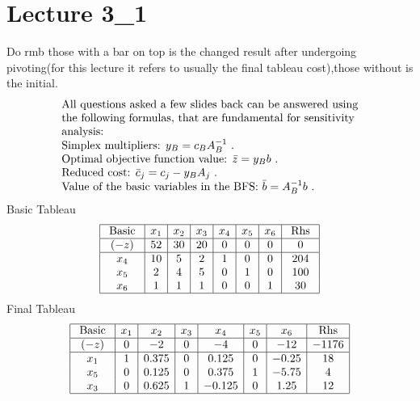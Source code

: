 \documentclass{article}
\begin{document}
\section{Lecture 3\_1}
Do rmb those with a bar on top is the changed result after undergoing pivoting(for this lecture it refers to usually the final tableau cost),those without is the initial.
$$
\begin{array} { l r } { \text { All questions asked a few slides back can be answered using } } \\ { \text { the following formulas, that are fundamental for sensitivity } } \\ { \text { analysis: } } \\ { \text {  Simplex multipliers: } y _ { B } = c _ { B } A _ { B } ^ { - 1 } \text { . } } \\ { \text { Optimal objective function value: } \bar { z } = y _ { B } b \text { . } } \\ { \text { Reduced cost: } \bar { c } _ { j } = c _ { j } - y _ { B } A _ { j } \text { . } } \\ { \text { Value of the basic variables in the BFS: } \bar { b } = A _ { B } ^ { - 1 } b \text { . } } \end{array}
$$
Basic Tableau
$$
\begin{array} { | c | c | c | c | c | c | c | c | } \hline \text { Basic } & { x _ { 1 } } & { x _ { 2 } } & { x _ { 3 } } & { x _ { 4 } } & { x _ { 5 } } & { x _ { 6 } } & { \text { Rhs } } \\ \hline ( - z ) & { 52 } & { 30 } & { 20 } & { 0 } & { 0 } & { 0 } & { 0 } \\ \hline x _ { 4 } & { 10 } & { 5 } & { 2 } & { 1 } & { 0 } & { 0 } & { 204 } \\ { x _ { 5 } } & { 2 } & { 4 } & { 5 } & { 0 } & { 1 } & { 0 } & { 100 } \\ { x _ { 6 } } & { 1 } & { 1 } & { 1 } & { 0 } & { 0 } & { 1 } & { 30 } \\ \hline \end{array}
$$
Final Tableau
$$
\begin{array} { | c | c | c | c | c | c | c | c | } \hline \text { Basic } & { x _ { 1 } } & { x _ { 2 } } & { x _ { 3 } } & { x _ { 4 } } & { x _ { 5 } } & { x _ { 6 } } & { \text { Rhs } } \\ \hline ( - z ) & { 0 } & { - 2 } & { 0 } & { - 4 } & { 0 } & { - 12 } & { - 1176 } \\ \hline x _ { 1 } & { 1 } & { 0.375 } & { 0 } & { 0.125 } & { 0 } & { - 0.25 } & { 18 } \\ { x _ { 5 } } & { 0 } & { 0.125 } & { 0 } & { 0.375 } & { 1 } & { - 5.75 } & { 4 } \\ { x _ { 3 } } & { 0 } & { 0.625 } & { 1 } & { - 0.125 } & { 0 } & { 1.25 } & { 12 } \\ \hline \end{array}
$$
\end{document}
